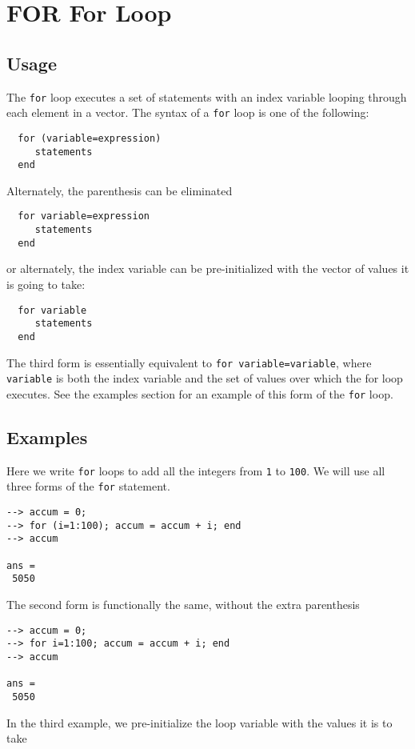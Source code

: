 \section{FOR For Loop}

\subsection{Usage}

The \verb|for| loop executes a set of statements with an
index variable looping through each element in a vector.
The syntax of a \verb|for| loop is one of the following:
\begin{verbatim}
  for (variable=expression)
     statements
  end
\end{verbatim}
Alternately, the parenthesis can be eliminated
\begin{verbatim}
  for variable=expression
     statements
  end
\end{verbatim}
or alternately, the index variable can be pre-initialized
with the vector of values it is going to take:
\begin{verbatim}
  for variable
     statements
  end
\end{verbatim}
The third form is essentially equivalent to \verb|for variable=variable|,
where \verb|variable| is both the index variable and the set of values
over which the for loop executes.  See the examples section for
an example of this form of the \verb|for| loop.
\subsection{Examples}

Here we write \verb|for| loops to add all the integers from
\verb|1| to \verb|100|.  We will use all three forms of the \verb|for|
statement.
\begin{verbatim}
--> accum = 0;
--> for (i=1:100); accum = accum + i; end
--> accum

ans = 
 5050 
\end{verbatim}
The second form is functionally the same, without the
extra parenthesis
\begin{verbatim}
--> accum = 0;
--> for i=1:100; accum = accum + i; end
--> accum

ans = 
 5050 
\end{verbatim}
In the third example, we pre-initialize the loop variable
with the values it is to take
\begin{verbatim}

\end{verbatim}
